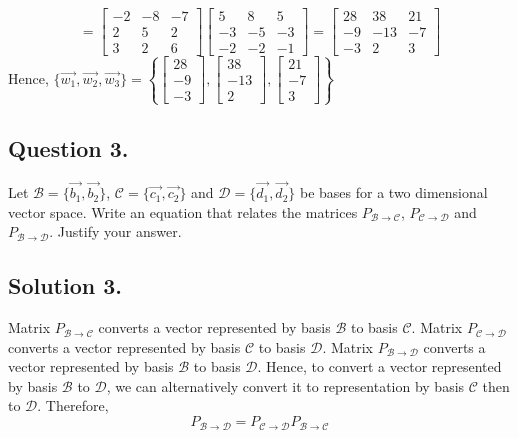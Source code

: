 \documentclass{article}
\begin{document}
\begin{enumerate} [label={(\arabic*)}]
\[=\left[\begin{array}{rrr}-2&-8&-7\\2&5&2\\3&2&6\end{array}\right]
\left[\begin{array}{rrr}5&8&5 \\-3&-5&-3 \\-2&-2&-1\end{array}\right]
=\left[\begin{array}{rrr}28&38&21 \\-9&-13&-7 \\-3&2&3\end{array}\right]\]
Hence, $\{\Vec{w_1},\Vec{w_2},\Vec{w_3}\}=\left\{\left[\begin{array}{r}28\\-9\\-3\end{array}\right],\left[\begin{array}{r}38\\-13\\2\end{array}\right],\left[\begin{array}{r}21\\-7\\3\end{array}\right]\right\}$
\end{enumerate}
\subsection*{Question 3.}
Let $\mathcal{B}=\{\Vec{b_1},\Vec{b_2}\}$, $\mathcal{C}=\{\Vec{c_1},\Vec{c_2}\}$ and $\mathcal{D}=\{\Vec{d_1},\Vec{d_2}\}$ be bases for a two dimensional vector space. Write an equation that relates the matrices $P_{\mathcal{B}\to\mathcal{C}}$, $P_{\mathcal{C}\to\mathcal{D}}$ and $P_{\mathcal{B}\to\mathcal{D}}$. Justify your answer. 
\subsection*{Solution 3.}
Matrix $P_{\mathcal{B}\to\mathcal{C}}$ converts a vector represented by basis $\mathcal{B}$ to basis $\mathcal{C}$. Matrix $P_{\mathcal{C}\to\mathcal{D}}$ converts a vector represented by basis $\mathcal{C}$ to basis $\mathcal{D}$. 
Matrix $P_{\mathcal{B}\to\mathcal{D}}$ converts a vector represented by basis $\mathcal{B}$ to basis $\mathcal{D}$.
Hence, to convert a vector represented by basis $\mathcal{B}$ to $\mathcal{D}$, we can alternatively convert it to representation by basis $\mathcal{C}$ then to $\mathcal{D}$. Therefore,
\[P_{\mathcal{B}\to\mathcal{D}}=P_{\mathcal{C}\to\mathcal{D}}P_{\mathcal{B}\to\mathcal{C}}\]
\end{document}
